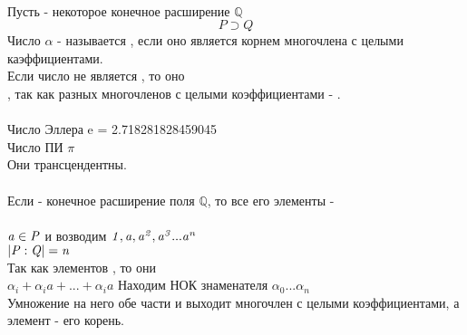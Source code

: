  \\
Пусть  - некоторое конечное расширение $\mathbb Q$\\
\[P \supset Q \]
Число $\alpha$ - называется , если оно является корнем многочлена с целыми каэффициентами. \\
Если число не является , то оно  \\

, так как разных многочленов с целыми коэффициентами - . \\
 \\
Число Эллера {\bk e} = 2.718281828459045 \\
Число ПИ $\pi $ \\
Они трансцендентны.\\

 \\

Если  - конечное расширение поля $\mathbb {Q}$, то все его элементы -  \\

 \\
$\mathit {a \in P}$ и возводим $\mathit {1, a, a^2, a^3...a^n}$ \\
$\mathit {|P:Q| = n}$ \\
Так как элементов , то они  \\
$\alpha_{i} + \alpha_{i}a + ... + \alpha_{i}a$  %
Находим НОК знаменателя $\alpha_{0} ... \alpha_{n}$ \\
Умножение на него обе части и выходит многочлен с целыми коэффициентами, а элемент  - его корень.
